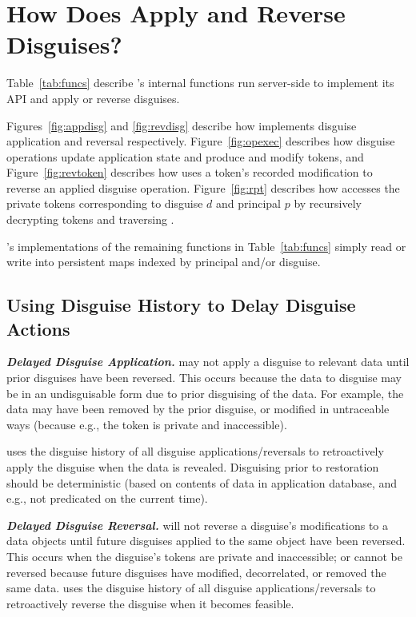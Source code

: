 \section{How Does \sys Apply and Reverse Disguises?}

Table~\ref{tab:funcs} describe \sys's internal functions run server-side to implement its API 
and apply or reverse disguises. 

Figures~\ref{fig:appdisg} and \ref{fig:revdisg} describe how \sys implements disguise application and
reversal respectively. Figure~\ref{fig:opexec} describes how disguise operations update application
state and produce and modify tokens, and 
Figure~\ref{fig:revtoken} describes how \sys uses a token's recorded
modification to reverse an applied disguise operation. 
Figure~\ref{fig:rpt} describes how \sys accesses the private tokens
corresponding to disguise $d$ and principal $p$ by recursively decrypting tokens and traversing
.

\sys's implementations of the remaining functions in Table~\ref{tab:funcs} simply read or write into
persistent maps indexed by principal and/or disguise.

\subsection{Using Disguise History to Delay Disguise Actions}
\noindent\textbf{\emph{Delayed Disguise Application.}}
\sys may not apply a disguise to relevant data until prior disguises have been reversed.
This occurs because the data to disguise may be in an undisguisable form due to prior disguising of
the data. For example, the data may have been removed by the prior disguise, or modified in
untraceable ways (because e.g., the token is private and inaccessible).

\sys uses the disguise history of all disguise applications/reversals to retroactively apply the
disguise when the data is revealed.  Disguising prior to restoration should be deterministic (based
on contents of data in application database, and e.g., not predicated on the current time).

\vspace{6pt}\noindent\textbf{\emph{Delayed Disguise Reversal.}}
\sys will not reverse a disguise's modifications to a data objects until future disguises applied to
the same object have been reversed.
This occurs when the disguise's tokens are private and inaccessible; or cannot be reversed because
future disguises have modified, decorrelated, or removed the same data.
\sys uses the disguise history of all disguise applications/reversals to retroactively reverse
the disguise when it becomes feasible.

